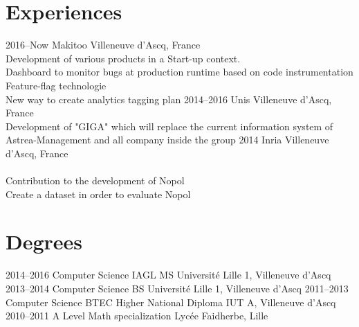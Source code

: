 \documentclass[hidelinks]{cv-style}          %
\begin{document}
\section{Experiences}
\begin{entrylist}
\entry
  {2016--Now}
  {Makitoo}
  {Villeneuve d'Ascq, France}
  {\\
  Development of various products in a Start-up context.\\
  Dashboard to monitor bugs at production runtime based on code instrumentation\\
  Feature-flag technologie\\
  New way to create analytics tagging plan
}
\entry
  {2014--2016}
  {Unis}
  {Villeneuve d'Ascq, France}
  {\\
  Development of "GIGA" which will replace the current information system of Astrea-Management and all company inside the group
}
\entry
  {2014}
  {Inria}
  {Villeneuve d'Ascq, France}
  {\\
  \\
  Contribution to the development of Nopol\\
  Create a dataset in order to evaluate Nopol
}


\end{entrylist}
\leavevmode\newline



\section{Degrees}
\begin{entrylist}

\entry
{2014--2016}
{Computer Science IAGL MS}
{Université Lille 1, Villeneuve d'Ascq}
{\vspace{-0.3cm}}
\entry
{2013--2014}
{Computer Science BS}
{Université Lille 1, Villeneuve d'Ascq}
{\vspace{-0.3cm}}
\entry
{2011--2013}
{Computer Science BTEC Higher National Diploma}
{IUT A, Villeneuve d'Ascq}
{\vspace{-0.3cm}}
\entry
{2010--2011}
{A Level {\normalfont Math specialization}}
{Lycée Faidherbe, Lille}
{\vspace{-0.3cm}}

\end{entrylist}
\leavevmode\newline
\end{document}
